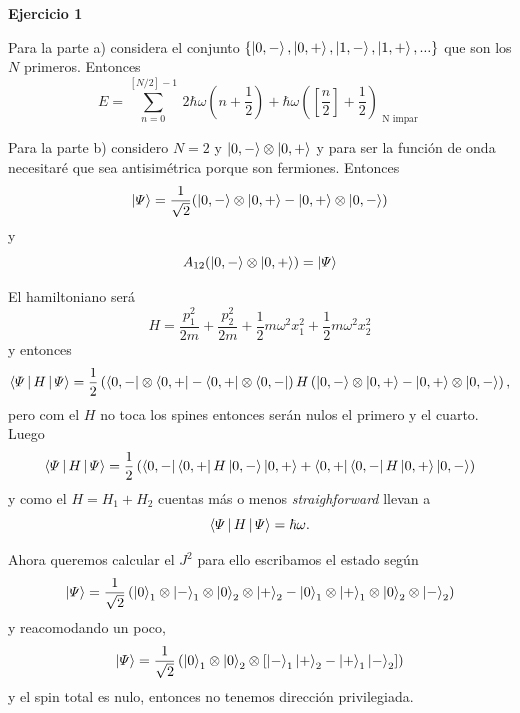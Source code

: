 \documentclass[10pt,oneside]{CBFT_book}
\begin{document}
\begin{ejemplo}{\bf Ejercicio 1}

Para la parte a) considera el conjunto $ \{ \Ket{0,-}, \Ket{0,+}, \Ket{1,-}, \Ket{1,+}, ... \} $
que son los $N$ primeros.
Entonces
\[
	E = \sum_{n=0}^{[N/2]-1} \: 2 \hbar \omega \left( n + \frac 1 2 \right) + 
	\hbar \omega \left( \left[ \frac{n}{2} \right] + \frac 1 2 \right)_{\text{ N impar }}
\]

Para la parte b) considero $N=2$ y $ \Ket{0,-} \otimes \Ket{0,+} $ y para ser la función de onda
necesitaré que sea antisimétrica porque son fermiones.
Entonces
\[
	\Ket{\Psi} = \frac{1}{\sqrt{2}}( \Ket{0,-} \otimes \Ket{0,+} - \Ket{0,+} \otimes \Ket{0,-} )
\]
y
\[
	A_{12} ( \Ket{0,-} \otimes \Ket{0,+} ) = \Ket{\Psi}
\]

El hamiltoniano será
\[
	H = \frac{p_1^2}{2m} + \frac{p_2^2}{2m} + \frac{1}{2} m \omega^2 x_1^2
	+  \frac{1}{2} m \omega^2 x_2^2
\]
y entonces
\[
	\Braket{\Psi|H|\Psi} = \frac{1}{2}
	\left( 
	\Bra{0,-} \otimes \Bra{0,+} - \Bra{0,+} \otimes \Bra{0,-}
	\right) H \left( 
	\Ket{0,-} \otimes \Ket{0,+} - \Ket{0,+} \otimes \Ket{0,-}
	\right),
\]
pero com el $H$ no toca los spines entonces serán nulos el primero y el cuarto. Luego
\[
	\Braket{\Psi|H|\Psi} = \frac{1}{2}
	\left(
	\Bra{0,-} \Bra{0,+} H \Ket{0,-}\Ket{0,+} + 
	\Bra{0,+} \Bra{0,-} H \Ket{0,+} \Ket{0,-}
	\right)
\]
y como el $H=H_1+H_2$ cuentas más o menos {\it straighforward} llevan a 
\[
	\Braket{\Psi|H|\Psi} = \hbar \omega.
\]

Ahora queremos calcular el $J^2$ para ello escribamos el estado según
\[
	\Ket{\Psi} = \frac{1}{\sqrt{2}}
	\left( 
	\Ket{0}_1 \otimes \Ket{-}_1 \otimes \Ket{0}_2 \otimes \Ket{+}_2 -
	\Ket{0}_1 \otimes \Ket{+}_1 \otimes \Ket{0}_2 \otimes \Ket{-}_2
	\right)
\]
y reacomodando un poco,
\[
	\Ket{\Psi} = \frac{1}{\sqrt{2}}
	\left( 
	\Ket{0}_1 \otimes \Ket{0}_2 \otimes 
	\left[ \Ket{-}_1  \Ket{+}_2 - \Ket{+}_1 \Ket{-}_2 \right] \right)
\]
y el spin total es nulo, entonces no tenemos dirección privilegiada.
 
\end{ejemplo}
\end{document}
